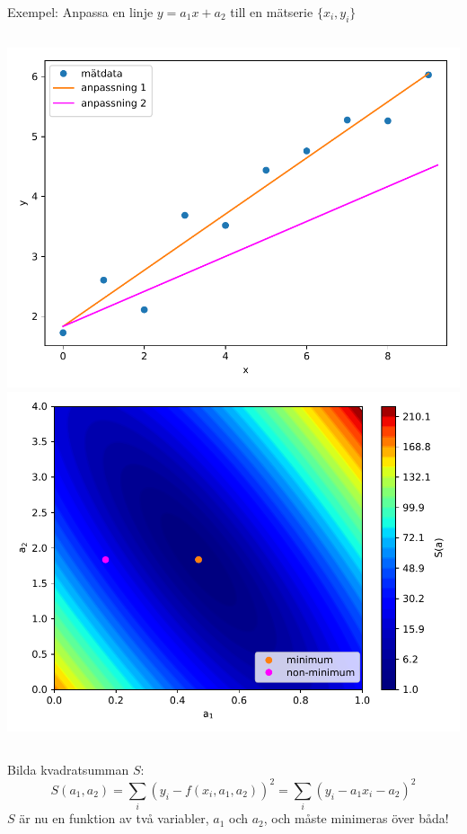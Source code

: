 \documentclass[9pt]{beamer}
\begin{document}
    \begin{frame}
        Exempel: Anpassa en linje $y=a_1x + a_2$ till en mätserie $\{x_i, y_i\}$ 
        \begin{columns}[T]
            \includegraphics[width=\textwidth]{anpassning2_2.pdf}
            \includegraphics[width=\textwidth]{s2_2.pdf}
        \end{columns}

        Bilda kvadratsumman $S$:
        \begin{equation*}
            S(a_1, a_2) = \sum_i (y_i - f(x_i,a_1,a_2))^2 = \sum_i (y_i - a_1x_i - a_2)^2
        \end{equation*}
        $S$ är nu en funktion av två variabler, $a_1$ och $a_2$, och måste minimeras över båda!
    \end{frame}
    
\end{document}
